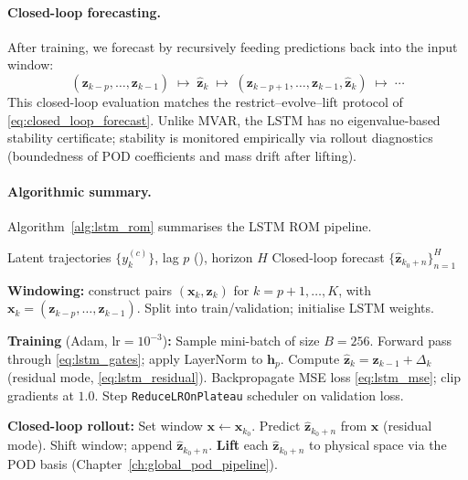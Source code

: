 \documentclass{report}
\theoremstyle{plain}
\theoremstyle{remark}
\numberwithin{equation}{section}              %
\begin{document}
\paragraph{Closed-loop forecasting.}
After training, we forecast by recursively feeding predictions back into
the input window:
\[
  (\mathbf{z}_{k-p},\ldots,\mathbf{z}_{k-1})
  \;\mapsto\; \widehat{\mathbf{z}}_{k}
  \;\mapsto\; (\mathbf{z}_{k-p+1},\ldots,\mathbf{z}_{k-1},\widehat{\mathbf{z}}_{k})
  \;\mapsto\;\cdots
\]
This closed-loop evaluation matches the restrict--evolve--lift protocol of
\eqref{eq:closed_loop_forecast}.
Unlike MVAR, the LSTM has no eigenvalue-based stability certificate;
stability is monitored empirically via rollout diagnostics
(boundedness of POD coefficients and mass drift after lifting).

\paragraph{Algorithmic summary.}
Algorithm~\ref{alg:lstm_rom} summarises the LSTM ROM pipeline.

\begin{algorithm}[H]
\caption{Latent LSTM ROM (): training and closed-loop rollout}
\label{alg:lstm_rom}
\begin{algorithmic}[1]
\Require Latent trajectories $\{y^{(c)}_k\}$, lag $p$ (), horizon $H$
\Ensure Closed-loop forecast $\{\widehat{\mathbf{z}}_{k_0+n}\}_{n=1}^{H}$

\State \textbf{Windowing:} construct pairs
  $(\mathbf{x}_k, \mathbf{z}_k)$ for $k=p{+}1,\ldots,K$,
  with $\mathbf{x}_k=(\mathbf{z}_{k-p},\ldots,\mathbf{z}_{k-1})$.
\State Split into train/validation; initialise LSTM weights.

\State \textbf{Training} (Adam, lr${}=10^{-3}$)\textbf{:}
  \State Sample mini-batch of size $B=256$.
  \State Forward pass through \eqref{eq:lstm_gates}; apply LayerNorm to $\mathbf{h}_p$.
  \State Compute $\widehat{\mathbf{z}}_k = \mathbf{z}_{k-1} + \Delta_k$ \quad (residual mode, \eqref{eq:lstm_residual}).
  \State Backpropagate MSE loss \eqref{eq:lstm_mse}; clip gradients at $1.0$.
  \State Step \texttt{ReduceLROnPlateau} scheduler on validation loss.
\EndWhile

\State \textbf{Closed-loop rollout:}
\State Set window $\mathbf{x}\gets\mathbf{x}_{k_0}$.
  \State Predict $\widehat{\mathbf{z}}_{k_0+n}$ from $\mathbf{x}$ (residual mode).
  \State Shift window; append $\widehat{\mathbf{z}}_{k_0+n}$.
\EndFor
\State \textbf{Lift} each $\widehat{\mathbf{z}}_{k_0+n}$ to physical space
  via the POD basis (Chapter~\ref{ch:global_pod_pipeline}).
\end{algorithmic}
\end{algorithm}
\end{document}
